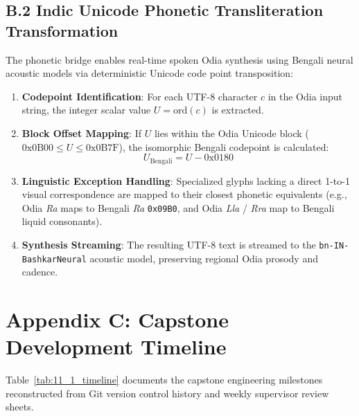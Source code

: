 \subsection{B.2 Indic Unicode Phonetic Transliteration Transformation}
The phonetic bridge enables real-time spoken Odia synthesis using Bengali neural acoustic models via deterministic Unicode code point transposition:
\begin{enumerate}
    \item \textbf{Codepoint Identification}: For each UTF-8 character $c$ in the Odia input string, the integer scalar value $U = \text{ord}(c)$ is extracted.
    \item \textbf{Block Offset Mapping}: If $U$ lies within the Odia Unicode block ($\text{0x0B00} \le U \le \text{0x0B7F}$), the isomorphic Bengali codepoint is calculated:
    \begin{equation}
        U_{\text{Bengali}} = U - \text{0x0180}
    \end{equation}
    \item \textbf{Linguistic Exception Handling}: Specialized glyphs lacking a direct 1-to-1 visual correspondence are mapped to their closest phonetic equivalents (e.g., Odia \textit{Ra} maps to Bengali \textit{Ra} \texttt{0x09B0}, and Odia \textit{Lla} / \textit{Rra} map to Bengali liquid consonants).
    \item \textbf{Synthesis Streaming}: The resulting UTF-8 text is streamed to the \texttt{bn-\allowbreak IN-\allowbreak Bashkar\allowbreak Neural} acoustic model, preserving regional Odia prosody and cadence.
\end{enumerate}


\section{Appendix C: Capstone Development Timeline}
\label{sec:app_timeline}

Table~\ref{tab:11_1_timeline} documents the capstone engineering milestones reconstructed from Git version control history and weekly supervisor review sheets.

